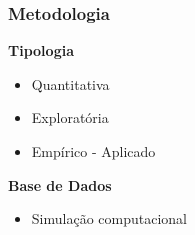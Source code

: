 \documentclass[11pt]{beamer}
\begin{document}
    \begin{frame}

        \frametitle{Metodologia}

            \textbf{Tipologia}
            \medskip

                \begin{itemize}
                    \item Quantitativa
                    \medskip
                    \item Exploratória
                    \medskip
                    \item Empírico - Aplicado
                \end{itemize}
            \bigskip

            \textbf{Base de Dados}
                \medskip

                \begin{itemize}
                    \item Simulação computacional
                \end{itemize}

    \end{frame}
\end{document}
